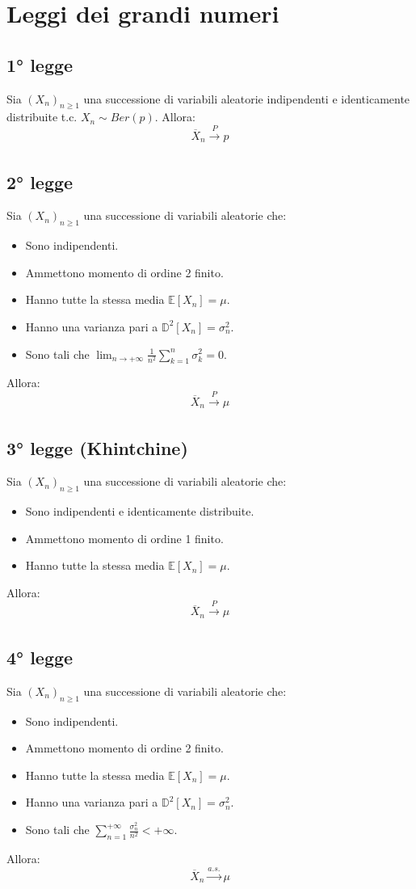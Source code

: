 \documentclass{article}
\begin{document}
\section*{Leggi dei grandi numeri}
\subsection*{1° legge}
Sia $(X_{n})_{n\geq 1}$ una successione di variabili aleatorie indipendenti e identicamente distribuite t.c. $X_{n} \sim Ber(p)$. Allora:
\[ \overline{X}_{n} \xrightarrow[]{P}p \]

\subsection*{2° legge}
Sia $(X_{n})_{n\geq 1}$ una successione di variabili aleatorie che:
\begin{itemize}
\item Sono indipendenti.
\item Ammettono momento di ordine 2 finito.
\item Hanno tutte la stessa media $\mathbb{E}[X_{n}] = \mu$.
\item Hanno una varianza pari a $\mathbb{D}^{2}[X_{n}] = \sigma_{n}^{2}$.
\item Sono tali che $\lim_{n\to +\infty}\frac{1}{n^{2}} \sum_{k=1}^{n}\sigma_{k}^{2}=0$.
\end{itemize}
Allora:
\[ \overline{X}_{n} \xrightarrow[]{P}\mu \]

\subsection*{3° legge (Khintchine)}
Sia $(X_{n})_{n\geq 1}$ una successione di variabili aleatorie che:
\begin{itemize}
\item Sono indipendenti e identicamente distribuite.
\item Ammettono momento di ordine 1 finito.
\item Hanno tutte la stessa media $\mathbb{E}[X_{n}] = \mu$.
\end{itemize}
Allora:
\[ \overline{X}_{n} \xrightarrow[]{P}\mu \]

\subsection*{4° legge}
Sia $(X_{n})_{n\geq 1}$ una successione di variabili aleatorie che:
\begin{itemize}
\item Sono indipendenti.
\item Ammettono momento di ordine 2 finito.
\item Hanno tutte la stessa media $\mathbb{E}[X_{n}] = \mu$.
\item Hanno una varianza pari a $\mathbb{D}^{2}[X_{n}] = \sigma_{n}^{2}$.
\item Sono tali che $\sum_{n=1}^{+\infty}\frac{\sigma_{n}^{2}}{n^{2}} < +\infty$.
\end{itemize}
Allora:
\[ \overline{X}_{n} \xrightarrow[]{a.s.}\mu \]
\end{document}
